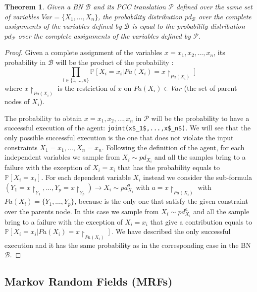 \documentclass[letterpaper]{article}
\theoremstyle{plain}
\newtheorem{theorem}{Theorem}[section]
\theoremstyle{definition}
\theoremstyle{remark}
\theoremstyle{definition}
\begin{document}
\begin{theorem}
Given a BN $\mathcal{B}$ and its PCC translation $\mathcal{P}$ defined over the same set of variables $Var= \{X_1, \ldots, X_n\}$, the probability distribution $pd_{\mathcal{B}}$ over the complete assignments of the variables defined by $\mathcal{B}$ is equal to the probability distribution $pd_{\mathcal{P}}$ over the complete assignments of the variables defined by $\mathcal{P}$.
\end{theorem}
\begin{proof}
Given a complete assignment of the variables $x=x_1,x_2, \ldots, x_n$, its probability in $\mathcal{B}$ will be the product of the probability :
$$\prod_{i \in \{1, \ldots, n\}} \mathbb{P}[X_i =x_i | Pa(X_i)=x\restriction_{Pa(X_i)}] $$ 
where $x\restriction_{Pa(X_i)}$  is the restriction of $x$ on $Pa(X_i) \subset Var$ (the set of parent nodes of $X_i$).

The probability to obtain $x=x_1,x_2, \ldots, x_n$ in $\mathcal{P}$ will be the probability to have a successful execution of the agent:
\lstinline[mathescape=true]{joint(x$_1$,...,x$_n$)}.
We will see that the only possible successful execution is the one that does not violate the input constraints $X_1=x_1, \ldots, X_n=x_n$. Following the definition of the agent, for each independent variables we sample from $X_i\sim pd_{X_i}$ and all the samples bring to a failure with the exception of $X_i=x_i$ that has the probability equals to $\mathbb{P}[X_i =x_i]$. For each dependent variable $X_i$ instead we consider the sub-formula $(Y_1=x\restriction_{Y_1}, \ldots, Y_p=x\restriction_{Y_p}) \rightarrow X_i \sim pd_{X_i}^{a}$ with $a=x \restriction_{Pa(X_i)}$ with $Pa(X_i)=\{Y_1, \ldots, Y_p\}$, because is the only one that satisfy the given constraint over the parents node. In this case we sample from $X_i\sim pd_{X_i}^a$ and all the sample bring to a failure with the exception of $X_i=x_i$ that give a contribution equals to $\mathbb{P}[X_i =x_i|Pa(X_i)=x\restriction_{Pa(X_i)}]$. We have described the only successful execution and it has the same probability as in the corresponding case in the BN $\mathcal{B}$.
 
\end{proof}


\subsection{Markov Random Fields (MRFs)}
\end{document}
